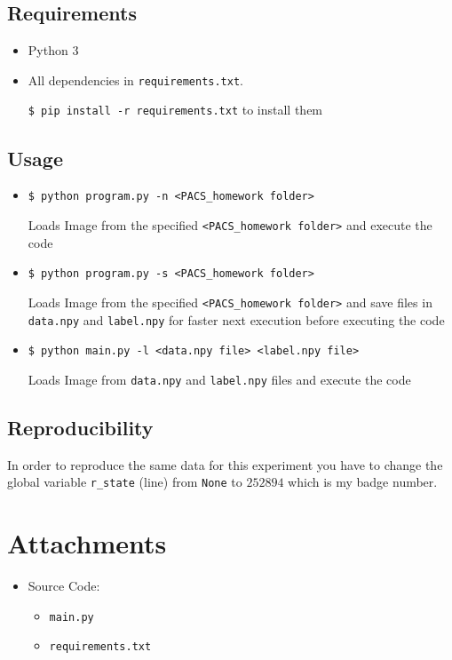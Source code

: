 \documentclass[a4paper, 11pt]{article}
\begin{document}
	\subsection{Requirements}
	\begin{itemize}
		\item Python 3
		\item All dependencies in \texttt{requirements.txt}.
		
		\texttt{\$ pip install -r requirements.txt} to install them
	\end{itemize}
	\subsection{Usage}
	\begin{itemize}
		\item \texttt{\$ python program.py -n <PACS\_homework folder>}
		
		Loads Image from the specified \texttt{<PACS\_homework folder>} and execute the code
		
		\item \texttt{\$ python program.py -s <PACS\_homework folder>}
		
		Loads Image from the specified \texttt{<PACS\_homework folder>} and save files in \texttt{data.npy} and \texttt{label.npy} for faster next execution before executing the code
		
		\item \texttt{\$ python main.py -l <data.npy file> <label.npy file> }
		
		Loads Image from \texttt{data.npy} and \texttt{label.npy} files and execute the code
	
	\end{itemize}
	\subsection{Reproducibility}
	In order to reproduce the same data for this experiment you have to change the global variable \texttt{r\_state} (line) from \texttt{None} to $252894$ which is my badge number.

	\section*{Attachments}
	\begin{itemize}
		\item Source Code:
		\begin{itemize}
			\item \texttt{main.py}
			\item \texttt{requirements.txt}
		\end{itemize}
	\end{itemize}
	
\end{document}
